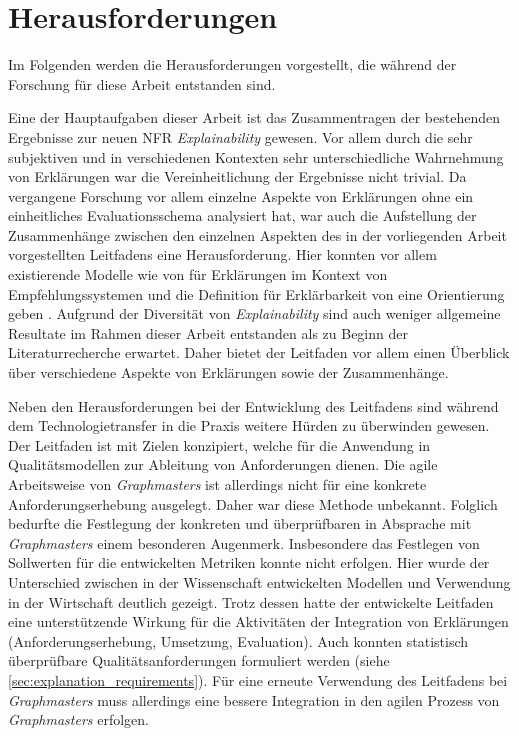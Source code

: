 \section{Herausforderungen}

Im Folgenden werden die Herausforderungen vorgestellt, die während der Forschung für diese Arbeit entstanden sind.

Eine der Hauptaufgaben dieser Arbeit ist das Zusammentragen der bestehenden Ergebnisse zur neuen NFR \textit{Explainability} gewesen. Vor allem durch die sehr subjektiven und in verschiedenen Kontexten sehr unterschiedliche Wahrnehmung von Erklärungen war die Vereinheitlichung der Ergebnisse nicht trivial. Da vergangene Forschung vor allem einzelne Aspekte von Erklärungen ohne ein einheitliches Evaluationsschema analysiert hat, war auch die Aufstellung der Zusammenhänge zwischen den einzelnen Aspekten des in der vorliegenden Arbeit vorgestellten Leitfadens eine Herausforderung. Hier konnten vor allem existierende Modelle wie von \citeauthor{nunes_systematic_2017} für Erklärungen im Kontext von Empfehlungssystemen und die Definition für Erklärbarkeit von \citeauthor{chazette_knowledge_nodate} eine Orientierung geben \cite{nunes_systematic_2017, chazette_knowledge_nodate}. Aufgrund der Diversität von \textit{Explainability} sind auch weniger allgemeine Resultate im Rahmen dieser Arbeit entstanden als zu Beginn der Literaturrecherche erwartet. Daher bietet der Leitfaden vor allem einen Überblick über verschiedene Aspekte von Erklärungen sowie der Zusammenhänge.

Neben den Herausforderungen bei der Entwicklung des Leitfadens sind während dem Technologietransfer in die Praxis weitere Hürden zu überwinden gewesen. Der Leitfaden ist mit Zielen konzipiert, welche für die Anwendung in Qualitätsmodellen zur Ableitung von Anforderungen dienen. Die agile Arbeitsweise von \textit{Graphmasters} ist allerdings nicht für eine konkrete Anforderungserhebung ausgelegt. Daher war diese Methode unbekannt. Folglich bedurfte die Festlegung der konkreten und überprüfbaren in Absprache mit \textit{Graphmasters} einem besonderen Augenmerk. Insbesondere das Festlegen von Sollwerten für die entwickelten Metriken konnte nicht erfolgen. Hier wurde der Unterschied zwischen in der Wissenschaft entwickelten Modellen und Verwendung in der Wirtschaft deutlich gezeigt. Trotz dessen hatte der entwickelte Leitfaden eine unterstützende Wirkung für die Aktivitäten der Integration von Erklärungen (Anforderungserhebung, Umsetzung, Evaluation). Auch konnten statistisch überprüfbare Qualitätsanforderungen formuliert werden (siehe \autoref{sec:explanation_requirements}). Für eine erneute Verwendung des Leitfadens bei \textit{Graphmasters} muss allerdings eine bessere Integration in den agilen Prozess von \textit{Graphmasters} erfolgen.